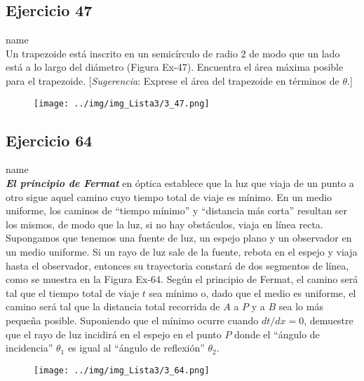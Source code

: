 \documentclass[12pt]{article}
\begin{document}
\subsection{Ejercicio 47} name \\

Un trapezoide está inscrito en un semicírculo de radio 2 de modo que un lado está a lo largo del diámetro (Figura Ex-47). Encuentra el área máxima posible para el trapezoide. [\textit{Sugerencia}: Exprese el área del trapezoide en términos de $\theta$.]
\begin{figure}[H]
\centering
\texttt{[image: ../img/img\_Lista3/3\_47.png]}
\end{figure}

\subsection{Ejercicio 64} name \\

\textit{\textbf{El principio de Fermat}} en óptica establece que la luz que viaja de un punto a otro sigue aquel camino cuyo tiempo total de viaje es mínimo. En un medio uniforme, los caminos de ``tiempo mínimo'' y ``distancia más corta'' resultan ser los mismos, de modo que la luz, si no hay obstáculos, viaja en línea recta. Supongamos que tenemos una fuente de luz, un espejo plano y un observador en un medio uniforme. Si un rayo de luz sale de la fuente, rebota en el espejo y viaja hasta el observador, entonces su trayectoria constará de dos segmentos de línea, como se muestra en la Figura Ex-64. Según el principio de Fermat, el camino será tal que el tiempo total de viaje $t$ sea mínimo o, dado que el medio es uniforme, el camino será tal que la distancia total recorrida de $A$ a $P$ y a $B$ sea lo más pequeña posible. Suponiendo que el mínimo ocurre cuando $dt/dx = 0$, demuestre que el rayo de luz incidirá en el espejo en el punto $P$ donde el ``ángulo de incidencia'' $\theta_1$ es igual al ``ángulo de reflexión'' $\theta_2$.
\begin{figure}[H]
\centering
\texttt{[image: ../img/img\_Lista3/3\_64.png]}
\end{figure}

\end{document}
